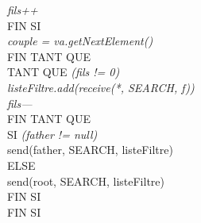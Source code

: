 \documentclass[a4paper,11pt]{report}
\begin{document}
\begin{flushleft}
\begin{framed}
\begin{enumerate}
\begin{tabbing}
					\> \> \> \textit{fils++}\\
					\> \> FIN SI\\
					\> \> \textit{couple = va.getNextElement()}\\
					\> FIN TANT QUE\\ 
					\> TANT QUE \= \textit{(fils != 0)}\\
					\> \> \textit{listeFiltre.add(receive(*, SEARCH, f))}\\
					\> \> \textit{fils---}\\
					\> FIN TANT QUE\\
					\> SI \= \textit{(father != null)}\\
					\> \> send(father, SEARCH, listeFiltre)\\
					\> ELSE\\
					\> \> send(root, SEARCH, listeFiltre)\\
					\> FIN SI\\
				FIN SI
			\end{tabbing}
		\end{enumerate}
	\end{framed}
\end{flushleft}
\end{document}

